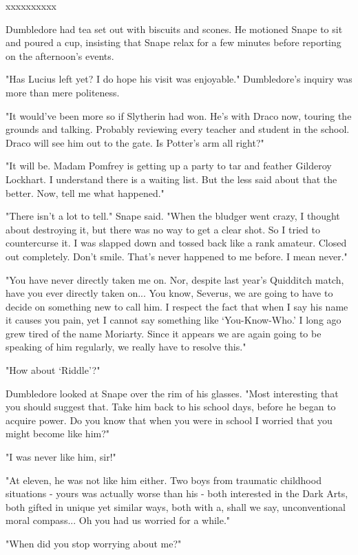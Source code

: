 \documentclass[a4paper,11pt]{article}
\begin{document}
xxxxxxxxxx

Dumbledore had tea set out with biscuits and scones. He motioned Snape to sit and poured a cup, insisting that Snape relax for a few minutes before reporting on the afternoon's events.

"Has Lucius left yet? I do hope his visit was enjoyable." Dumbledore's inquiry was more than mere politeness.

"It would've been more so if Slytherin had won. He's with Draco now, touring the grounds and talking. Probably reviewing every teacher and student in the school. Draco will see him out to the gate. Is Potter's arm all right?"

"It will be. Madam Pomfrey is getting up a party to tar and feather Gilderoy Lockhart. I understand there is a waiting list. But the less said about that the better. Now, tell me what happened."

"There isn't a lot to tell." Snape said. "When the bludger went crazy, I thought about destroying it, but there was no way to get a clear shot. So I tried to countercurse it. I was slapped down and tossed back like a rank amateur. Closed out completely. Don't smile. That's never happened to me before. I mean never."

"You have never directly taken me on. Nor, despite last year's Quidditch match, have you ever directly taken on... You know, Severus, we are going to have to decide on something new to call him. I respect the fact that when I say his name it causes you pain, yet I cannot say something like `You-Know-Who.' I long ago grew tired of the name Moriarty. Since it appears we are again going to be speaking of him regularly, we really have to resolve this."

"How about `Riddle'?"

Dumbledore looked at Snape over the rim of his glasses. "Most interesting that you should suggest that. Take him back to his school days, before he began to acquire power. Do you know that when you were in school I worried that you might become like him?"

"I was never like him, sir!"

"At eleven, he was not like him either. Two boys from traumatic childhood situations - yours was actually worse than his - both interested in the Dark Arts, both gifted in unique yet similar ways, both with a, shall we say, unconventional moral compass... Oh you had us worried for a while."

"When did you stop worrying about me?"
\end{document}

